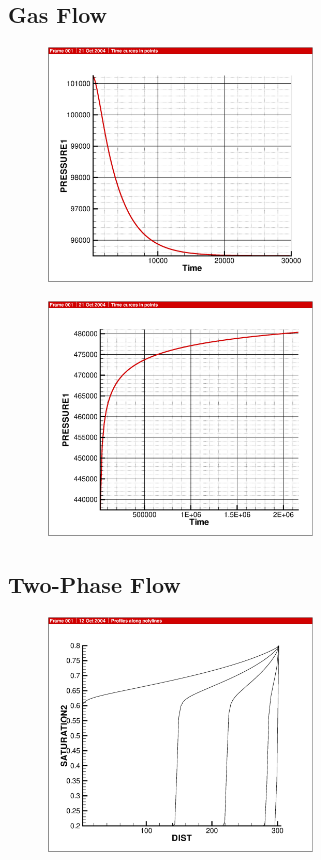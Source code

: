 {\newpage
\subsection{Gas Flow}

\begin{figure}[htb!]
  \includegraphics[width=7cm]{figures/h_gas_line.eps}\\
\end{figure}

\begin{figure}[htb!]
  \includegraphics[width=7cm]{figures/h_gas_quad.eps}\\
\end{figure}

\newpage
\subsection{Two-Phase Flow}

\begin{figure}[htb!]
  \includegraphics[width=7cm]{figures/h2_line.eps}\\
\end{figure}

}
